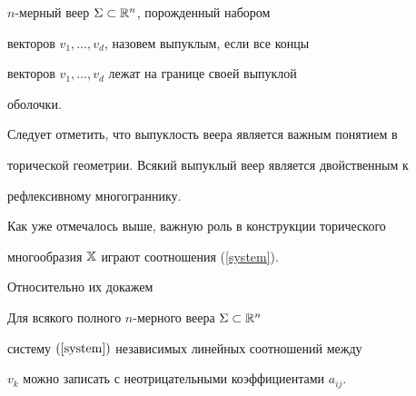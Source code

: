 \begin{defn}


$n$-мерный веер $\Sigma\subset\Bbb{R}^n$, порожденный набором


векторов $v_1,\dotsc,v_d$, назовем выпуклым, если все концы


векторов $v_1,\dotsc,v_d$ лежат на границе своей выпуклой


оболочки.


\end{defn}





Следует отметить, что выпуклость веера  является важным понятием в


торической геометрии. Всякий выпуклый веер является двойственным к


рефлексивному многограннику.





Как уже отмечалось выше, важную роль в конструкции торического


многообразия $\Bbb{X}$ играют соотношения (\ref{system}).


Относительно их докажем 








\begin{prop}


Для всякого полного $n$-мерного веера  $\Sigma\subset\Bbb{R}^n$


систему $(\ref{system})$ независимых линейных соотношений между


$v_k$ можно записать с неотрицательными коэффициентами $a_{ij}$.


\end{prop}








